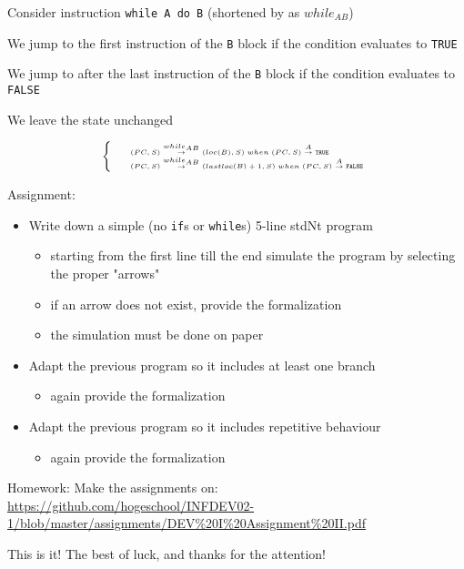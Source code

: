 \documentclass{beamer}
\begin{document}
\begin{slide}{
\item Consider instruction \texttt{while A do B} (shortened by as $while_{AB}$)
\pause
\item We jump to the first instruction of the \texttt{B} block if the condition evaluates to \texttt{TRUE}
\pause
\item We jump to after the last instruction of the \texttt{B} block if the condition evaluates to \texttt{FALSE}
\pause
\item We leave the state unchanged
\pause

$$
\tiny
\left\lbrace
\begin{array}{l l}
&(PC,S) \overset{while_{AB}}{\rightarrow} (loc(B),S) \; when \; (PC,S) \overset{A}{\rightarrow} \mathtt{TRUE} \\
&(PC,S) \overset{while_{AB}}{\rightarrow} (lastloc(B)+1,S) \; when \; (PC,S) \overset{A}{\rightarrow} \mathtt{FALSE} \\
\end{array}
\right.
$$

}\end{slide}

\begin{frame}{Assignment:}
\begin{itemize}
    \item Write down a simple (no \texttt{if}s or \texttt{while}s) 5-line stdNt program
    \begin{itemize}
            \item starting from the first line till the end simulate the program by selecting the proper "arrows"
            \item if an arrow does not exist, provide the formalization
            \item the simulation must be done on paper
    \end{itemize}
    \item Adapt the previous program so it includes at least one branch
    \begin{itemize}
            \item again provide the formalization
    \end{itemize}
    \item Adapt the previous program so it includes repetitive behaviour
    \begin{itemize}
            \item again provide the formalization
    \end{itemize}
\end{itemize}
\end{frame}

\begin{frame}{Homework:}
Make the assignments on: \url{https://github.com/hogeschool/INFDEV02-1/blob/master/assignments/DEV\%20I\%20Assignment\%20II.pdf}
\end{frame}


\begin{frame}{This is it!}
\center
\fontsize{18pt}{7.2}\selectfont
The best of luck, and thanks for the attention!
\end{frame}
\end{document}
